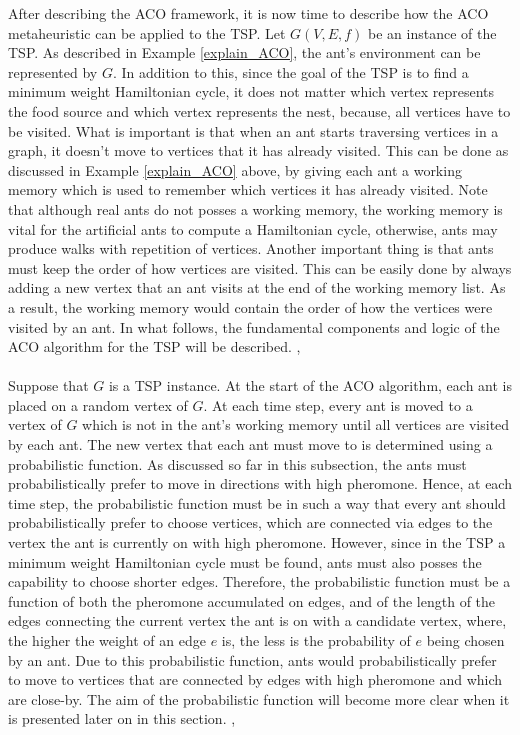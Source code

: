\documentclass{article}
\begin{document}
After describing the ACO framework, it is now time to describe how the ACO metaheuristic can be applied to the TSP.  Let $G(V,E,f)$ be an instance of the TSP. As described in Example \ref{explain_ACO}, the ant's environment can be represented by $G$. In addition to this, since the goal of the TSP is to find a minimum weight Hamiltonian cycle, it does not matter which vertex represents the food source and which vertex represents the nest, because, all vertices have to be visited. What is important is that when an ant starts traversing vertices in a graph, it doesn't move to vertices that it has already visited. This can be done as discussed in Example \ref{explain_ACO} above, by giving each ant a working memory which is used to remember which vertices it has already visited. Note that although real ants do not posses a working memory, the working memory is vital for the artificial ants to compute a Hamiltonian cycle, otherwise, ants may produce walks with repetition of vertices. Another important thing is that ants must keep the order of how vertices are visited. This can be easily done by always adding a new vertex that an ant visits at the end of the working memory list. As a result, the working memory would contain the order of how the vertices were visited by an ant. In what follows, the fundamental components and logic of the ACO algorithm for the TSP will be described. \cite{dorigo_gambardella_1997}, \cite{dorigo_stutzle_thomas_2004}\\\\
Suppose that $G$ is a TSP instance. At the start of the ACO algorithm, each ant is placed on a random vertex of $G$. At each time step, every ant is moved to a vertex of $G$ which is not in the ant's working memory until all vertices are visited by each ant. The new vertex that each ant must move to is determined using a probabilistic function. As discussed so far in this subsection, the ants must probabilistically prefer to move in directions with high pheromone. Hence, at each time step, the probabilistic function must be in such a way that every ant should probabilistically prefer to choose vertices, which are connected via edges to the vertex the ant is currently on with high pheromone. However, since in the TSP a minimum weight Hamiltonian cycle must be found, ants must also posses the capability to choose shorter edges. Therefore, the probabilistic function must be a function of both the pheromone accumulated on edges, and of the length of the edges connecting the current vertex the ant is on with a candidate vertex, where, the higher the weight of an edge $e$  is, the less is the probability of $e$ being chosen by an ant. Due to this probabilistic function, ants would probabilistically prefer to move to vertices that are connected by edges with high pheromone and which are close-by. The aim of the probabilistic function will become more clear when it is presented later on in this section. \cite{dorigo_gambardella_1997}, \cite{dorigo_stutzle_thomas_2004}\\\\
\end{document}
